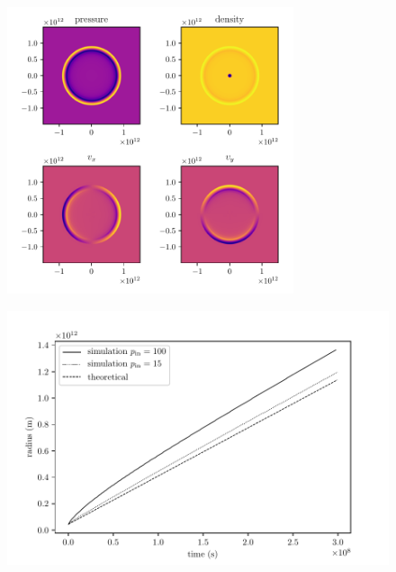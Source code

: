 \documentclass{beamer}
\begin{document}
\begin{frame}
	\begin{figure}[h]
		\centering
		\includegraphics[width=0.75\textwidth]{figures/output.pdf}
	\end{figure}	
\end{frame}
\begin{frame}
	\begin{figure}[h]
		\centering
		\includegraphics[width=\textwidth]{figures/non_linear_effects.pdf}
	\end{figure}
\end{frame}
\end{document}
